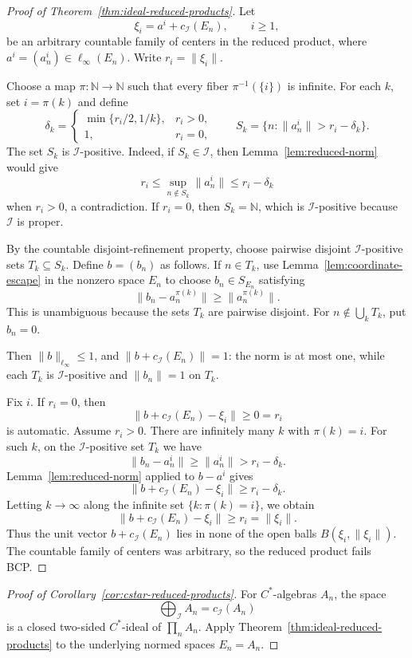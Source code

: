 \documentclass[11pt]{article}
\newcommand{\N}{\mathbb N}
\newcommand{\cI}{\mathcal I}
\begin{document}
\begin{proof}[Proof of Theorem~\ref{thm:ideal-reduced-products}]
Let
\[
        \xi_i=a^i+c_\cI(E_n),\qquad i\ge1,
\]
be an arbitrary countable family of centers in the reduced product, where
\(a^i=(a^i_n)\in\ell_\infty(E_n)\).  Write \(r_i=\|\xi_i\|\).

Choose a map \(\pi:\N\to\N\) such that every fiber \(\pi^{-1}(\{i\})\) is
infinite.  For each \(k\), set \(i=\pi(k)\) and define
\[
        \delta_k=
        \begin{cases}
        \min\{r_i/2,1/k\},& r_i>0,\\
        1,& r_i=0,
        \end{cases}
        \qquad
        S_k=\{n:\|a^i_n\|>r_i-\delta_k\}.
\]
The set \(S_k\) is \(\cI\)-positive.  Indeed, if \(S_k\in\cI\), then
Lemma~\ref{lem:reduced-norm} would give
\[
        r_i\le \sup_{n\notin S_k}\|a^i_n\|\le r_i-\delta_k
\]
when \(r_i>0\), a contradiction.  If \(r_i=0\), then \(S_k=\N\), which is
\(\cI\)-positive because \(\cI\) is proper.

By the countable disjoint-refinement property, choose pairwise disjoint
\(\cI\)-positive sets \(T_k\subseteq S_k\).  Define \(b=(b_n)\) as follows.
If \(n\in T_k\), use Lemma~\ref{lem:coordinate-escape} in the nonzero space
\(E_n\) to choose \(b_n\in S_{E_n}\) satisfying
\[
        \|b_n-a^{\pi(k)}_n\|\ge \|a^{\pi(k)}_n\|.
\]
This is unambiguous because the sets \(T_k\) are pairwise disjoint.  For
\(n\notin\bigcup_k T_k\), put \(b_n=0\).

Then \(\|b\|_{\ell_\infty}\le1\), and
\(\|b+c_\cI(E_n)\|=1\): the norm is at most one, while each \(T_k\) is
\(\cI\)-positive and \(\|b_n\|=1\) on \(T_k\).

Fix \(i\).  If \(r_i=0\), then
\[
        \|b+c_\cI(E_n)-\xi_i\|\ge0=r_i
\]
is automatic.  Assume \(r_i>0\).  There are infinitely many \(k\) with
\(\pi(k)=i\).  For such \(k\), on the \(\cI\)-positive set \(T_k\) we have
\[
        \|b_n-a^i_n\|\ge \|a^i_n\|>r_i-\delta_k.
\]
Lemma~\ref{lem:reduced-norm} applied to \(b-a^i\) gives
\[
        \|b+c_\cI(E_n)-\xi_i\|\ge r_i-\delta_k.
\]
Letting \(k\to\infty\) along the infinite set \(\{k:\pi(k)=i\}\), we obtain
\[
        \|b+c_\cI(E_n)-\xi_i\|\ge r_i=\|\xi_i\|.
\]
Thus the unit vector \(b+c_\cI(E_n)\) lies in none of the open balls
\(B(\xi_i,\|\xi_i\|)\).  The countable family of centers was arbitrary, so the
reduced product fails BCP.
\end{proof}

\begin{proof}[Proof of Corollary~\ref{cor:cstar-reduced-products}]
For \(C^*\)-algebras \(A_n\), the space
\[
        \bigoplus\nolimits_{\cI} A_n
        =
        c_\cI(A_n)
\]
is a closed two-sided \(C^*\)-ideal of \(\prod_n A_n\).  Apply
Theorem~\ref{thm:ideal-reduced-products} to the underlying normed spaces
\(E_n=A_n\).
\end{proof}
\end{document}
